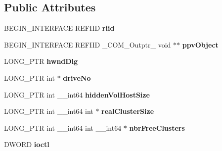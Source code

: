\subsection*{Public Attributes}
\begin{DoxyCompactItemize}
\item 
\mbox{\label{struct_i_gost_crypt_format_com_vtbl_af1a2a9713a752866b385f9e9228f7e15}} 
B\+E\+G\+I\+N\+\_\+\+I\+N\+T\+E\+R\+F\+A\+CE R\+E\+F\+I\+ID {\bfseries riid}
\item 
\mbox{\label{struct_i_gost_crypt_format_com_vtbl_a7296e186cdbc84b3d433e153e367fe10}} 
B\+E\+G\+I\+N\+\_\+\+I\+N\+T\+E\+R\+F\+A\+CE R\+E\+F\+I\+ID \+\_\+\+C\+O\+M\+\_\+\+Outptr\+\_\+ void $\ast$$\ast$ {\bfseries ppv\+Object}
\item 
\mbox{\label{struct_i_gost_crypt_format_com_vtbl_aba68ffc7f48aa9b608c12891760e5bea}} 
L\+O\+N\+G\+\_\+\+P\+TR {\bfseries hwnd\+Dlg}
\item 
\mbox{\label{struct_i_gost_crypt_format_com_vtbl_ada02e1f207098aabb98d0760f30f03d6}} 
L\+O\+N\+G\+\_\+\+P\+TR int $\ast$ {\bfseries drive\+No}
\item 
\mbox{\label{struct_i_gost_crypt_format_com_vtbl_aaf6b0045570a25d579d2d3ae589feac4}} 
L\+O\+N\+G\+\_\+\+P\+TR int \+\_\+\+\_\+int64 {\bfseries hidden\+Vol\+Host\+Size}
\item 
\mbox{\label{struct_i_gost_crypt_format_com_vtbl_aac89d58f23ab16e01ba320772331a543}} 
L\+O\+N\+G\+\_\+\+P\+TR int \+\_\+\+\_\+int64 int $\ast$ {\bfseries real\+Cluster\+Size}
\item 
\mbox{\label{struct_i_gost_crypt_format_com_vtbl_afeb10bc1c57dd14e570d167a1e9b6353}} 
L\+O\+N\+G\+\_\+\+P\+TR int \+\_\+\+\_\+int64 int \+\_\+\+\_\+int64 $\ast$ {\bfseries nbr\+Free\+Clusters}
\item 
\mbox{\label{struct_i_gost_crypt_format_com_vtbl_a3112f3acc75c44e2d7e25dd3c12d6d7b}} 
D\+W\+O\+RD {\bfseries ioctl}
$$
\end{DoxyCompactItemize}

